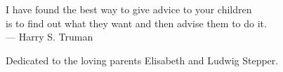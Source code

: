 \thispagestyle{empty}
{}

\vspace*{3cm}

\begin{center}

%    
%    
    I have found the best way to give advice to your children \\
     is to find out what they want and then advise them to do it. \\ \medskip
     --- Harry S. Truman
      
\end{center}

\medskip

\begin{center}
    Dedicated to the loving parents Elisabeth and Ludwig Stepper. 
\end{center}